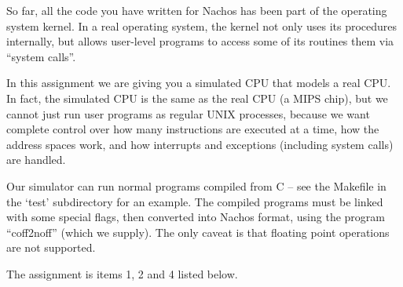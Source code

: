 So far, all the code you have written for Nachos has been part of the
operating system kernel. In a real operating system, the kernel not only 
uses its procedures internally, but allows user-level programs to access 
some of its routines them via ``system calls''.

In this assignment we are giving you a simulated CPU that models a real CPU.
In fact, the simulated
CPU is the same as the real CPU (a MIPS chip), but we cannot just run
user programs as regular UNIX processes, because we want complete
control over how many instructions are executed at a time, how the
address spaces work, and how interrupts and exceptions (including
system calls) are handled.

Our simulator can run normal programs compiled from C -- see 
the Makefile in the `test' subdirectory for an example.  The compiled
programs must be linked with some special flags, then converted into 
Nachos format, using the program ``coff2noff'' (which we supply).
The only caveat is that floating point operations are not supported.   

The assignment is items 1, 2 and 4 listed below.

